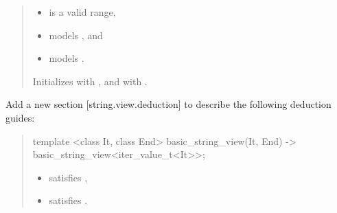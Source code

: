 \documentclass{wg21}
\begin{document}
\begin{quote}
\begin{addedblock}
\begin{itemdescr}
    \expects
    \begin{itemize}
	    \item {} is a valid range,
	    \item {} models , and
    	\item {} models .
	\end{itemize}

    \effects
    Initializes  with , and  with .

\end{itemdescr}
\end{addedblock}
\end{quote}


Add a new section [string.view.deduction] to describe the following deduction guides:



\begin{quote}
\begin{addedblock}
\begin{itemdecl}
template <class It, class End>
basic_string_view(It, End) -> basic_string_view<iter_value_t<It>>;
\end{itemdecl}
\begin{itemdescr}
    \constraints
    \begin{itemize}
        \item {} satisfies ,
        \item {} satisfies .
    \end{itemize}
\end{itemdescr}


\end{addedblock}
\end{quote}
\end{document}
